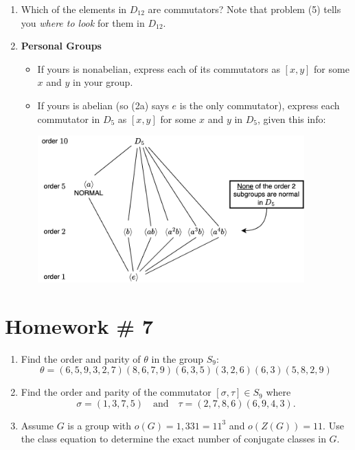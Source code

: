 \begin{enumerate}
    \item Which of the elements in \( D_{12} \) are commutators? Note that problem (5) tells you \textit{where to look} for them in \( D_{12} \). \\ \steezybreak
    
    \item \textbf{Personal Groups}
    
    \begin{itemize}
        \item If yours is nonabelian, express each of its commutators as \( [x,y] \) for some \( x \) and \( y \) in your group.
        
        \item If yours is abelian (so (2a) says \( e \) is the only commutator), express each commutator in \( D_5 \) as \( [x,y] \) for some \( x \) and \( y \) in \( D_5 \), given this info:
        \begin{center}
            \includegraphics[width=0.85\textwidth]{Figures/HW6_Subgroup_Lattice.png}
        \end{center}
    \end{itemize}

\end{enumerate}

\newpage 



\section{Homework \# 7}
\label{sec:HW7}

\begin{enumerate}
    \item Find the order and parity of \( \theta \) in the group \( S_9 \):
    \[
    \theta = (6,5,9,3,2,7)(8,6,7,9)(6,3,5)(3,2,6)(6,3)(5,8,2,9)
    \]

    \item Find the order and parity of the commutator \( [\sigma, \tau] \in S_9 \) where 
    \[
    \sigma = (1,3,7,5) \quad \text{and} \quad \tau = (2,7,8,6)(6,9,4,3).
    \]

    \item Assume \( G \) is a group with \( o(G) = 1,331 = 11^3 \) and \( o(Z(G)) = 11 \).  
    Use the class equation to determine the exact number of conjugate classes in \( G \). \\ \steezybreak

\end{enumerate}

